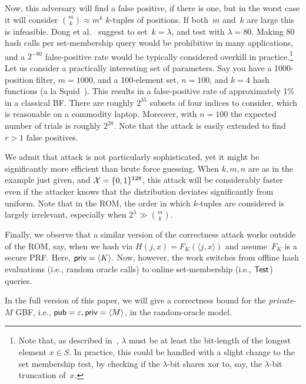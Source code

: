 Now, this adversary will find a false positive, if there is one, but
in the worst case it will consider $\binom{m}{k} \approx m^k$
$k$-tuples of positions.  If both~$m$ and~$k$ are large this is
infeasible.  Dong et al.~\cite{CCS:DonCheWen13} suggest to
set~$k=\lambda$, and test with $\lambda=80$.  Making 80 hash calls
per set-membership query would be prohibitive in many applications,
and a $2^{-80}$ false-positive rate would be typically considered
overkill in practice.\footnote{Note that, as described
in~\cite{CCS:DonCheWen13}, $\lambda$ must be at least the bit-length
of the longest element $x \in S$. In practice, this could be
  handled with a slight change to the set membership test, by checking
if the $\lambda$-bit shares xor to, say, the $\lambda$-bit truncation
of~$x$.}
Let us consider a practically interesting set of parameters. Say you have a 1000-position
filter, $m=1000$, and a 100-element set, $n=100$,  and $k=4$ hash
functions (a la Squid~\cite{fan2000summary}).  This results in a false-positive rate of
approximately 1\% in a classical BF.  There are roughly $2^{35}$
subsets of four indices to consider, which is reasonable on a
commodity laptop.  Moreover, with $n=100$ the expected
number of trials is roughly $2^{28}$.
Note that the attack is easily extended to find $r>1$ false positives.

We admit that attack is not particularly sophisticated, yet it might
be significantly more efficient than brute force guessing.  When $k,m,n$ are as in the example just given, and ${\cal X}=\{0,1\}^{128}$,
this attack will be considerably faster even if the attacker knows that the distribution deviates significantly from uniform.   Note that in the ROM, the order in which $k$-tuples are considered is largely irrelevant, especially when $2^\lambda \gg \binom{m}{k}$.

Finally, we observe that a similar version of the correctness attack
works outside of the ROM, say, when we hash via $H(j,x)=F_K(\langle
j,x \rangle)$ and assume~$F_K$ is a secure PRF.  Here,
${\sf priv}=\langle K \rangle$.  Now,
however, the work switches from offline hash evaluations (i.e., random
oracle calls) to online set-membership (i.e., $\mathsf{Test}$) queries.

In the full version of this paper, we will give a correctness bound
for the \emph{private}-$M$ GBF, i.e., ${\sf pub}=\varepsilon,
{\sf priv}=\langle M \rangle$, in the random-oracle model.
%

